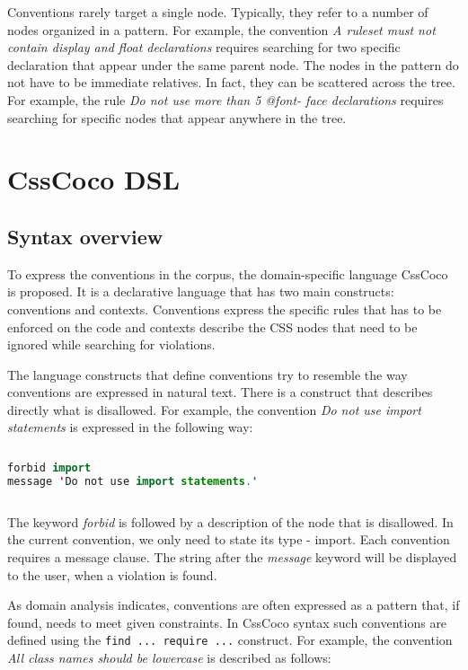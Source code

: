 Conventions rarely target a single node. Typically, they refer to a number of
nodes organized in a pattern. For example, the convention \textit{A ruleset
must not contain display and float declarations} requires searching for two
specific declaration that appear under the same parent node. The nodes in the
pattern do not have to be immediate relatives. In fact, they can be scattered
across the tree. For example, the rule \textit{Do not use more than 5 @font-
face declarations} requires searching for specific nodes that appear anywhere
in the tree.

\section{CssCoco DSL}

\subsection{Syntax overview}

To express the conventions in the corpus, the domain-specific language CssCoco
is proposed. It is a declarative language that has two main constructs:
conventions and contexts. Conventions express the specific rules that has to
be enforced on the code and contexts describe the CSS nodes that need to be
ignored while searching for violations.

The language constructs that define conventions try to resemble the way
conventions are expressed in natural text. There is a construct that describes
directly what is disallowed. For example, the convention \textit{Do not use
import statements} is expressed in the following way:

\begin{sourcecode}
\begin{lstlisting}[style=mono,language=Java]
forbid import
message 'Do not use import statements.'
\end{lstlisting}
\end{sourcecode}

The keyword \textit{forbid} is followed by a description of the node that is
disallowed. In the current convention, we only need to state its type -
import. Each convention requires a message clause. The string after the
\textit{message} keyword will be displayed to the user, when a violation is
found.

As domain analysis indicates, conventions are often expressed as a pattern that, if found, needs to
meet given constraints. In CssCoco syntax such conventions are defined using the \texttt{find ...
require ...} construct. For example, the convention \textit{All class names should be lowercase} is
described as follows:

